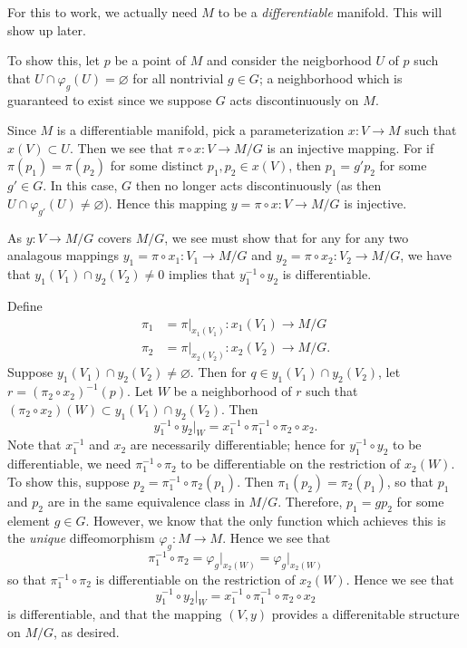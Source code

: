 \documentclass[12pt,letterpaper,boxed]{math_hw_pset}
\renewcommand{\phi}{\varphi}
\begin{document}
\begin{solution}
    For this to work, we actually need $M$ to be a \textit{differentiable} manifold. 
    This will show up later.

    To show this, let $p$ be a point of $M$ and consider the neigborhood 
    $U$ of $p$ such that $U \cap \phi_g(U) = \varnothing$ for all nontrivial $g \in G$; 
    a neighborhood which is guaranteed to exist since we suppose $G$ acts discontinuously 
    on $M$. 

    Since $M$ is a differentiable manifold, pick a parameterization $x: V \to M$ 
    such that $x(V) \subset U$. Then we see that $\pi \circ x: V \to M/G$ is 
    an injective mapping. For if $\pi(p_1) = \pi(p_2)$ for some distinct 
    $p_1, p_2 \in x(V)$,
    then $p_1 = g'p_2$ for some $g' \in  G$. In this case, $G$ then 
    no longer acts discontinuously (as then $U \cap \phi_{g'}(U) \ne \varnothing$).
    Hence this mapping $y = \pi \circ x: V \to M/G$ is injective.

    As $y: V \to M/G$ covers $M/G$, we see must show that for any for any two 
    analagous mappings $y_1 = \pi\circ x_1: V_1 \to M/G$ and 
    $y_2 = \pi\circ x_2: V_2 \to M/G$, we have that $y_1(V_1)\cap y_2(V_2) \ne 0$   
    implies that $y_1^{-1}\circ y_2$ is differentiable. 

    Define 
    \begin{align*}
        \pi_1&= \pi\big|_{x_1(V_1)}: x_1(V_1) \to M/G\\
        \pi_2&= \pi\big|_{x_2(V_2)}: x_2(V_2) \to M/G.
    \end{align*}
    Suppose $y_1(V_1)\cap  y_2(V_2) \ne \varnothing$. Then for $q \in y_1(V_1)\cap y_2(V_2)$, 
    let $r = (\pi_2\circ x_2)^{-1}(p)$. Let $W$ be a neighborhood of $r$ 
    such that $(\pi_2 \circ x_2)(W) \subset y_1(V_1)\cap y_2(V_2)$. Then 
    \[
        y_1^{-1}\circ y_2\big|_W = x_1^{-1}\circ \pi_1^{-1}\circ\pi_2 \circ x_2.
    \] 
    Note that $x_1^{-1}$ and $x_2$ are necessarily differentiable; hence 
    for $y_1^{-1} \circ y_2$ to be differentiable, we need $\pi_1^{-1}\circ\pi_2$  to 
    be differentiable on the restriction of $x_2(W)$. To show this, suppose $p_2 = \pi_1^{-1}\circ \pi_2(p_1)$. 
    Then $\pi_1(p_2) = \pi_2(p_1)$, so that $p_1$ and $p_2$ are in the same equivalence 
    class in $M/G$. Therefore, $p_1 = gp_2$ for some element $g \in  G$. 
    However, we know that the only function which achieves this is the \textit{unique} 
    diffeomorphism $\phi_g: M \to M$. Hence we see that 
    \[
        \pi_1^{-1}\circ\pi_2 = \phi_g\big|_{x_2(W)} = \phi_g\big|_{x_2(W)}
    \]
    so that $\pi_1^{-1}\circ\pi_2$ is differentiable on the restriction of $x_2(W)$.
    Hence we  see that 
    \[
        y_1^{-1}\circ y_2\big|_W = x_1^{-1}\circ \pi_1^{-1}\circ\pi_2 \circ x_2
    \]
    is differentiable, and that the mapping $(V, y)$ provides a differenitable structure 
    on $M/G$, as desired. 






\end{solution}
\end{document}
